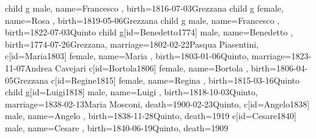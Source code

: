 \documentclass{article}
\begin{document}
\begin{midpage}
\begin{center}
\begin{genealogypicture}
{{{{{{                    }
                    child{
                        g{
                            male,
                            name={Francesco },
                            birth={1816-07-03}{Grezzana}
                        }
                    }
                    child{
                        g{
                            female,
                            name={Rosa },
                            birth={1819-05-06}{Grezzana}
                        }
                    }
                    child{
                        g{
                            male,
                            name={Francesco },
                            birth={1822-07-03}{Quinto}
                        }
                    }
                }
                child{
                    g[id=Benedetto1774]{
                        male,
                        name={Benedetto },
                        birth={1774-07-26}{Grezzana},
                        marriage={1802-02-22}{Pasqua Piasentini},
                    }
                    c[id=Maria1803]{
                        female,
                        name={Maria },
                        birth={1803-01-06}{Quinto},
                        marriage={1823-11-07}{Andrea Cavejari}
                    }
                    c[id=Bortola1806]{
                        female,
                        name={Bortola },
                        birth={1806-04-05}{Grezzana}
                    }
                    c[id=Regine1815]{
                        female,
                        name={Regina },
                        birth={1815-03-16}{Quinto}
                    }
                    child{
                        g[id=Luigi1818]{
                            male,
                            name={Luigi },
                            birth={1818-10-03}{Quinto},
                            marriage={1838-02-13}{Maria Mosconi},
                            death={1900-02-23}{Quinto},
                        }
                        c[id=Angelo1838]{
                            male,
                            name={Angelo },
                            birth={1838-11-28}{Quinto},
                            death={1919}{}
                        }
                        c[id=Cesare1840]{
                            male,
                            name={Cesare },
                            birth={1840-06-19}{Quinto},
                            death={1909}{}
}}}}}}}
\end{genealogypicture}
\end{center}
\end{midpage}
\end{document}
